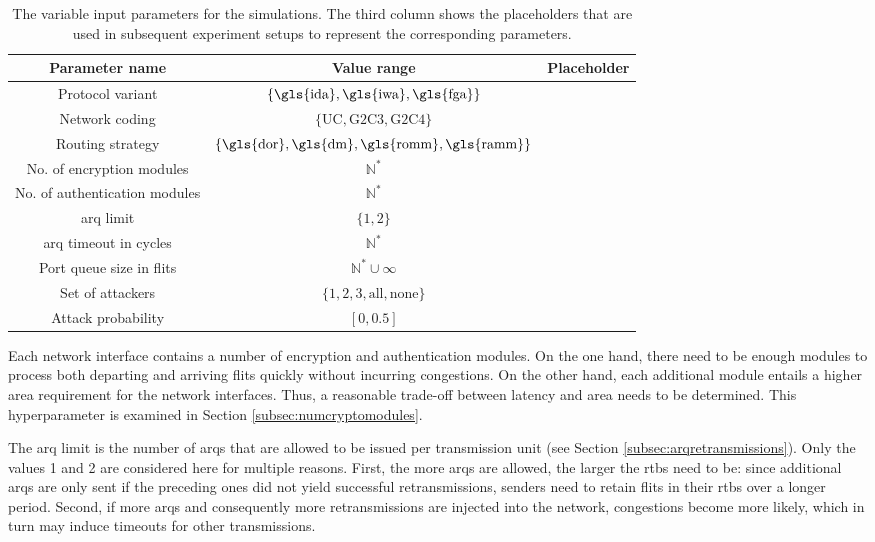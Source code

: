 \begin{table}
    \centering
    \begin{tabulary}{\textwidth}{C|C|C}
        Parameter name & Value range & Placeholder \\\hline
        Protocol variant & $\{\text{\gls{ida}}, \text{\gls{iwa}}, \text{\gls{fga}}\}$ & \pProtVar{} \\
        Network coding & $\{\text{UC}, \text{G2C3}, \text{G2C4}\}$ & \pNCMode{} \\
        Routing strategy & $\{\text{\gls{dor}}, \text{\gls{dm}}, \text{\gls{romm}}, \text{\gls{ramm}}\}$ & \pRStrat{} \\
        No. of encryption modules & $\mathbb{N}^*$ & \pEncMods{} \\
        No. of authentication modules & $\mathbb{N}^*$ & \pAuthMods{} \\
        \Gls{arq} limit & $\{1, 2\}$ & \pARQLimit{} \\
        \Gls{arq} timeout in cycles & $\mathbb{N}^*$ & \pARQTimeout{} \\
        Port queue size in flits & $\mathbb{N}^* \cup \infty$ & \pRQSize{} \\
        Set of attackers & $\{1, 2, 3, \text{all}, \text{none}\}$ & \pAttackerSet{} \\
        Attack probability & $[0, 0.5]$ & \pAttackProb{} \\
    \end{tabulary}
    \caption[Variable input parameters for the simulations]{The variable input parameters for the simulations. The third column shows the placeholders
    that are used in subsequent experiment setups to represent the corresponding parameters.}
    \label{tab:inputparams}
\end{table}

Each network interface contains a number of encryption and authentication modules. On the one hand, there need to be enough modules to process both
departing and arriving flits quickly without incurring congestions. On the other hand, each additional module entails a higher area requirement for
the network interfaces. Thus, a reasonable trade-off between latency and area needs to be determined. This hyperparameter is examined in Section
\ref{subsec:numcryptomodules}.

The \gls{arq} limit is the number of \glspl{arq} that are allowed to be issued per transmission unit (see Section \ref{subsec:arqretransmissions}).
Only the values 1 and 2 are considered here for multiple reasons. First, the more \glspl{arq} are allowed, the larger the \glspl{rtb} need to be:
since additional \glspl{arq} are only sent if the preceding ones did not yield successful retransmissions, senders need to retain flits in their
\glspl{rtb} over a longer period. Second, if more \glspl{arq} and consequently more retransmissions are injected into the network, congestions become
more likely, which in turn may induce timeouts for other transmissions.

